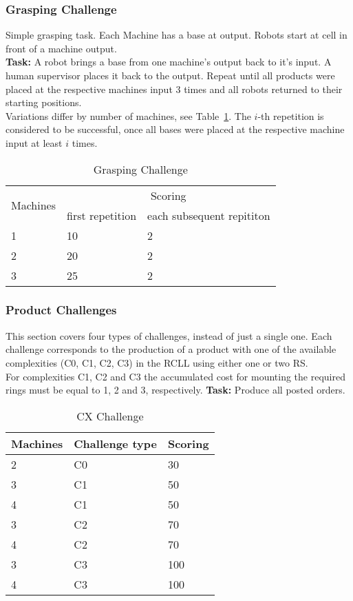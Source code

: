 \documentclass[12pt,twoside]{article}
\newcommand{\reftab}[1]{Table~\ref{#1}}
\begin{document}
\subsubsection{Grasping Challenge}\label{sec:challenge-grasping}
Simple grasping task.
Each Machine has a base at output.
Robots start at cell in front of a machine output.\\
\textbf{Task:} A robot brings a base from one machine's output back to it's
input. A human supervisor places it back to the output. Repeat until all
products were placed at the respective machines input 3 times and all robots
returned to their starting positions. \\
Variations differ by number of machines, see
\reftab{tab:challenge-grasping}. The $i$-th repetition is considered to be
successful, once all bases were placed at the respective machine input
at least $i$ times.

\begin{table}[!htb]
    \centering
        \begin{tabular}{l|l|l}
					\multirow{2}{*}{Machines}
					& \multicolumn{2}{c}{Scoring} \\\cline{2-3}
					& first repetition
					& each subsequent repititon  \\\hline\hline
					1 & 10 & 2 \\
					2 & 20 & 2 \\
					3 & 25 & 2 \\
        \end{tabular}
    \caption{Grasping Challenge}
    \label{tab:challenge-grasping}
\end{table}

\subsubsection{Product Challenges}\label{sec:challenge-cx}
This section covers four types of challenges, instead of just a single one.
Each challenge corresponds to the production of a product with one of the
available complexities (C0, C1, C2, C3) in the \ac{RCLL} using either
one or two \ac{RS}.\\
For complexities C1, C2 and C3 the accumulated cost for mounting the required
rings must be equal to 1, 2 and 3, respectively.
\textbf{Task:} Produce all posted orders.\\
\begin{table}[!htb]
    \centering
        \begin{tabular}{l|l|l}
					Machines & Challenge type & Scoring \\\hline
					2 & C0 & 30\\
					3 & C1 & 50 \\
					4 & C1 & 50 \\
					3 & C2 & 70 \\
					4 & C2 & 70 \\
					3 & C3 & 100 \\
					4 & C3 & 100 \\
        \end{tabular}
    \caption{CX Challenge}
    \label{tab:challenge-cx}
\end{table}
\end{document}

